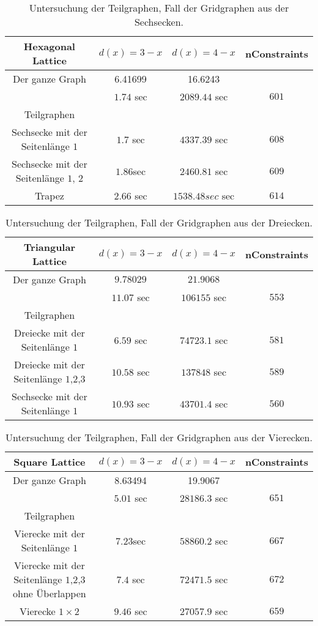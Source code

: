 \documentclass[
	fontsize=12pt,
	paper=a4,
	twoside=false,
	numbers=noenddot,
	plainheadsepline,
	toc=listof,
	toc=bibliography
]{scrartcl}
\begin{document}
	\begin{table}[htbp]
	\centering
	\begin{tabular}{|c|c|c|c|}
	\hline Hexagonal Lattice& $d(x)=3-x$  & $d(x)=4-x$ & nConstraints\\ \hline 
		Der ganze Graph	&  6.41699	& 16.6243 & \\ 
			& $1.74$ sec	& $2089.44$ sec & $601$\\ \hline
		Teilgraphen & & &\\\hline
		Sechsecke mit der Seitenlänge $1$ & $1.7$ sec	&  $4337.39$ sec & $608$\\ \hline
		Sechsecke mit der Seitenlänge $1$, $2$	&  $1.86$sec	& $2460.81$  sec & $609$\\ \hline
		Trapez& $2.66$ sec  & $1538.48sec$  sec & $614$ \\ \hline
	\end{tabular}
	\caption{Untersuchung der Teilgraphen, Fall der Gridgraphen aus der Sechsecken.} 
	\label{Table:TG1}
	\end{table}
	
	\begin{table}[htbp]
	\centering
	\begin{tabular}{|c|c|c|c|}
		\hline Triangular Lattice& $d(x)=3-x$  & $d(x)=4-x$ & nConstraints\\ \hline 
		Der ganze Graph&  $9.78029$	& $21.9068$ &\\ 
			& $11.07$ sec	&  $106155$ sec & $553$\\ \hline
		Teilgraphen & & &\\\hline
		Dreiecke mit der Seitenlänge $1$& $6.59$ sec	& $74723.1$ sec & $581$\\ \hline
		Dreiecke mit der Seitenlänge $1$,$2$,$3$&  $10.58$ sec	& $137848$ sec & $589$\\ \hline
		Sechsecke mit der Seitenlänge $1$ & $10.93$  sec & $43701.4$ sec & $560$ \\ \hline
	\end{tabular}
	\caption{Untersuchung der Teilgraphen, Fall der Gridgraphen aus der Dreiecken.}
	\label{Table:TG2}
	\end{table}
	
	
	\begin{table}[htbp]
	\centering
	\begin{tabular}{|c|c|c|c|}
	\hline Square Lattice& $d(x)=3-x$  & $d(x)=4-x$ & nConstraints\\ \hline 
		Der ganze Graph	&  8.63494	& 19.9067 & \\ 
			& $5.01$ sec	& $28186.3$ sec & $651$\\ \hline
		Teilgraphen & & &\\ \hline
		Vierecke mit der Seitenlänge $1$&  $7.23$sec	&  $58860.2$ sec & $667$\\ \hline
		Vierecke mit der Seitenlänge $1$,$2$,$3$ ohne Überlappen&  $7.4$ sec & $72471.5$ sec & $672$\\ \hline
		Vierecke $1\times 2$ & $9.46$ sec& $27057.9$ sec & $659$\\ \hline
	\end{tabular}
	\caption{Untersuchung der Teilgraphen, Fall der Gridgraphen aus der Vierecken.} 
	\label{Table:TG3}
	\end{table}
	
\end{document}
